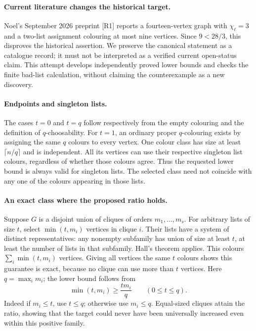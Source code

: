 \documentclass[11pt,a4paper]{article}
\begin{document}
\paragraph{Current literature changes the historical target.}
Noel's September 2026 preprint [R1] reports a fourteen-vertex graph with
$\chi_\ell=3$ and a two-list assignment colouring at most nine vertices.
Since $9<28/3$, this disproves the historical assertion. We preserve the
canonical statement as a catalogue record; it must not be interpreted as
a verified current open-status claim. This attempt develops independently
proved lower bounds and checks the finite bad-list calculation, without
claiming the counterexample as a new discovery.

\paragraph{Endpoints and singleton lists.}
The cases $t=0$ and $t=q$ follow respectively from the empty colouring
and the definition of $q$-choosability. For $t=1$, an ordinary proper
$q$-colouring exists by assigning the same $q$ colours to every vertex.
One colour class has size at least $\lceil n/q\rceil$ and is independent.
All its vertices can use their respective singleton list colours, regardless
of whether those colours agree. Thus the requested lower bound is always
valid for singleton lists. The selected class need not coincide with
any one of the colours appearing in those lists.

\paragraph{An exact class where the proposed ratio holds.}
Suppose $G$ is a disjoint union of cliques of orders $m_1,\ldots,m_s$.
For arbitrary lists of size $t$, select $\min(t,m_i)$ vertices in clique
$i$. Their lists have a system of distinct representatives: any nonempty
subfamily has union of size at least $t$, at least the number of lists
in that subfamily. Hall's theorem applies. This colours
$\sum_i\min(t,m_i)$ vertices. Giving all vertices the same $t$ colours
shows this guarantee is exact, because no clique can use more than $t$
vertices. Here $q=\max_i m_i$; the lower bound follows from
\[
            \min(t,m_i)\ge\frac{tm_i}{q}\qquad(0\le t\le q).
\]
Indeed if $m_i\le t$, use $t\le q$; otherwise use $m_i\le q$.
Equal-sized cliques attain the ratio, showing that the target could never
have been universally increased even within this positive family.
\end{document}
